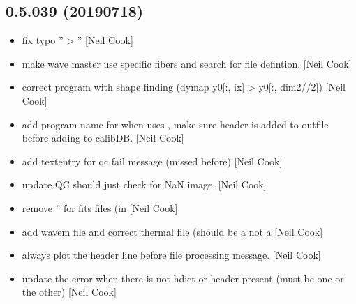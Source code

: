 \documentclass[a4paper,10pt,english]{report}
\begin{document}
\subsection{0.5.039 (2019\sphinxhyphen{}07\sphinxhyphen{}18)}
\label{\detokenize{misc/changelog:id121}}\begin{itemize}
\item {} 
 \sphinxhyphen{} fix typo ” \textendash{}\textgreater{} ” {[}Neil
Cook{]}

\item {} 
 \sphinxhyphen{} make wave master use specific fibers and search for file
defintion. {[}Neil Cook{]}

\item {} 
 \sphinxhyphen{} correct program with shape finding (dymap y0{[}:, ix{]} \textendash{}\textgreater{}
y0{[}:, dim2//2{]}) {[}Neil Cook{]}

\item {} 
 \sphinxhyphen{} add program name for when  uses
 , make sure header is added to outfile
before adding to calibDB. {[}Neil Cook{]}

\item {} 
 \sphinxhyphen{} add textentry for qc fail message (missed before)
{[}Neil Cook{]}

\item {} 
 \sphinxhyphen{} update QC should just check for NaN image.
{[}Neil Cook{]}

\item {} 
 \sphinxhyphen{} remove ” for fits files (in 
{[}Neil Cook{]}

\item {} 
 \sphinxhyphen{} add wavem file and correct thermal file (should
be a  not a  {[}Neil Cook{]}

\item {} 
 \sphinxhyphen{} always plot the header line before file processing
message. {[}Neil Cook{]}

\item {} 
 \sphinxhyphen{} update the error when there is not hdict or header
present (must be one or the other) {[}Neil Cook{]}


\end{itemize}
\end{document}
